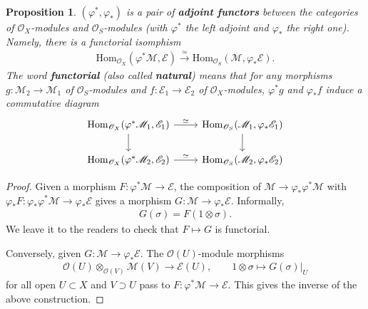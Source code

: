 \documentclass[12pt,b5paper,notitlepage]{report}
\theoremstyle{definition}
\theoremstyle{plain}
\newtheorem{pp}[df]{Proposition}
\newcommand{\Hom}{\mathrm{Hom}}
\newcommand{\scr}{\mathscr}
\numberwithin{equation}{section}
\begin{document}
\begin{pp}
$(\varphi^*,\varphi_*)$ is a pair of \textbf{adjoint functors} between the categories of $\scr O_X$-modules and $\scr O_S$-modules  (with $\varphi^*$ the left adjoint and $\varphi_*$ the right one). Namely, there is a functorial isomphism
\begin{align}
\Hom_{\scr O_X}(\varphi^*\scr M,\scr E)\xrightarrow{\simeq}\Hom_{\scr O_S}(\scr M,\varphi_*\scr E).
\end{align}
The word \textbf{functorial} (also called \textbf{natural})  means that for any morphisms $g:\scr M_2\rightarrow\scr M_1$ of $\scr O_S$-modules and $f:\scr E_1\rightarrow\scr E_2$ of $\scr O_X$-modules, $\varphi^*g$ and $\varphi_*f$ induce a commutative diagram
\begin{equation}
\begin{tikzcd}
\Hom_{\scr O_X}(\varphi^*\scr M_1,\scr E_1) \arrow[d] \arrow[r,"\simeq"] & \Hom_{\scr O_S}(\scr M_1,\varphi_*\scr E_1) \arrow[d] \\
\Hom_{\scr O_X}(\varphi^*\scr M_2,\scr E_2) \arrow[r,"\simeq"]           & \Hom_{\scr O_S}(\scr M_2,\varphi_*\scr E_2)          
\end{tikzcd}
\end{equation}
\end{pp}

\begin{proof}
Given a morphism $F:\varphi^*\scr M\rightarrow\scr E$, the composition of $\scr M\rightarrow\varphi_*\varphi^*\scr M$ with $\varphi_*F:\varphi_*\varphi^*\scr M\rightarrow\varphi_*\scr E$ gives a morphism $G:\scr M\rightarrow\varphi_*\scr E$. Informally,
\begin{align}
G(\sigma)=F(1\otimes\sigma).
\end{align}
We leave it to the readers to check that $F\mapsto G$ is functorial.

Conversely, given $G:\scr M\rightarrow\varphi_*\scr E$. The $\scr O(U)$-module morphisms
\begin{gather*}
\scr O(U)\otimes_{\scr O(V)}\scr M(V)\rightarrow\scr E(U),\qquad 1\otimes\sigma\mapsto G(\sigma)|_U
\end{gather*}
for all open $U\subset X$ and $V\supset U$ pass to $F:\varphi^*\scr M\rightarrow\scr E$. This gives the inverse of the above construction.
\end{proof}
\end{document}

